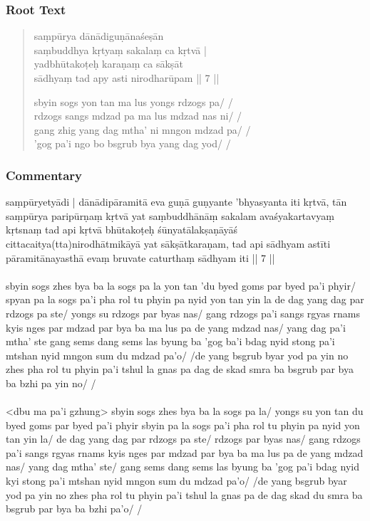 \documentclass[12pt]{article}
\begin{document}
\subsubsection{Root Text}
\begin{quote}
	saṃpūrya dānādiguṇānaśeṣān \\
	saṃbuddhya kṛtyaṃ sakalaṃ ca kṛtvā |\\
	yadbhūtakoṭeḥ karaṇaṃ ca sākṣāt \\
	sādhyaṃ tad apy asti nirodharūpam || 7 ||

	sbyin sogs yon tan ma lus yongs rdzogs pa/ /\\
	rdzogs sangs mdzad pa ma lus mdzad nas ni/ /\\
	gang zhig yang dag mtha' ni mngon mdzad pa/ /\\
	'gog pa'i ngo bo bsgrub bya yang dag yod/ /
\end{quote}

\subsubsection{Commentary}
saṃpūryetyādi | dānādipāramitā eva guṇā guṇyante 'bhyasyanta iti kṛtvā, tān saṃpūrya paripūrṇaṃ kṛtvā yat saṃbuddhānāṃ sakalam avaśyakartavyaṃ kṛtsnaṃ tad api kṛtvā bhūtakoṭeḥ śūnyatālakṣaṇāyāś cittacaitya(tta)nirodhātmikāyā yat sākṣātkaraṇam, tad api sādhyam astīti pāramitānayasthā evaṃ bruvate caturthaṃ sādhyam iti || 7 ||\\

\textbf{\TVA}\\
sbyin sogs zhes bya ba la sogs pa la yon tan 'du byed goms par byed pa'i phyir/ spyan pa la sogs pa'i pha rol tu phyin pa nyid yon tan yin la de dag yang dag par rdzogs pa ste/ yongs su rdzogs par byas nas/ gang rdzogs pa'i sangs rgyas rnams kyis nges par mdzad par bya ba ma lus pa de yang mdzad nas/ yang dag pa'i mtha' ste gang sems dang sems las byung ba 'gog ba'i bdag nyid stong pa'i mtshan nyid mngon sum du mdzad pa'o/ /de yang bsgrub byar yod pa yin no zhes pha rol tu phyin pa'i tshul la gnas pa dag de skad smra ba bsgrub par bya ba bzhi pa yin no/ /\\

\textbf{\TVB}\\
<dbu ma pa'i gzhung> sbyin sogs zhes bya ba la sogs pa la/ yongs su yon tan du byed goms par byed pa'i phyir sbyin pa la sogs pa'i pha rol tu phyin pa nyid yon tan yin la/ de dag yang dag par rdzogs pa ste/ rdzogs par byas nas/ gang rdzogs pa'i sangs rgyas rnams kyis nges par mdzad par bya ba ma lus pa de yang mdzad nas/ yang dag mtha' ste/ gang sems dang sems las byung ba 'gog pa'i bdag nyid kyi stong pa'i mtshan nyid mngon sum du mdzad pa'o/ /de yang bsgrub byar yod pa yin no zhes pha rol tu phyin pa'i tshul la gnas pa de dag skad du smra ba bsgrub par bya ba bzhi pa'o/ /
\end{document}
